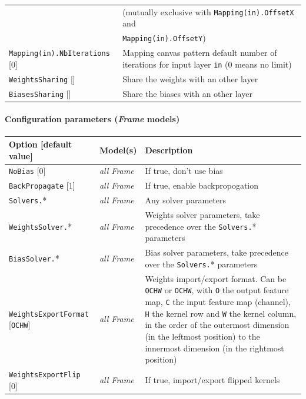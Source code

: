 \documentclass[a4paper,11pt,oneside]{article}
\begin{document}
\begin{center}
\begin{longtable}{| p{5cm} | p{10cm} | }
   & (mutually exclusive with \lstinline!Mapping(in).OffsetX! and \\
   & \lstinline!Mapping(in).OffsetY!) \\
  \lstinline!Mapping(in).NbIterations! [0] & Mapping canvas pattern default
   number of iterations for input layer \lstinline!in! (0 means no limit) \\
  \lstinline!WeightsSharing! [] & Share the weights with an other layer \\
  \lstinline!BiasesSharing! [] & Share the biases with an other layer \\
 \hline
\end{longtable}
\end{center}

\paragraph{Configuration parameters (\emph{Frame} models)}

\begin{center}
 \begin{longtable}{| p{4cm} | p{3cm} | p{9cm} | }
 \hline
 Option [default value] & Model(s) & Description\\
 \hline\hline
  \lstinline!NoBias! [0] & \emph{all Frame} & If true, don't use bias \\
  \lstinline!BackPropagate! [1] & \emph{all Frame} & If true, enable
  backpropogation \\
  \lstinline!Solvers.!* & \emph{all Frame} & Any solver parameters \\
  \lstinline!WeightsSolver.!* & \emph{all Frame} & Weights solver parameters,
  take precedence over the \lstinline!Solvers.!* parameters \\
  \lstinline!BiasSolver.!* & \emph{all Frame} & Bias solver parameters,
  take precedence over the \lstinline!Solvers.!* parameters \\
  \lstinline!WeightsExportFormat! [\lstinline!OCHW!] & \emph{all Frame} &
  Weights import/export format. Can be \lstinline!OCHW! or \lstinline!OCHW!,
  with \lstinline!O! the output feature map, \lstinline!C! the input feature map
   (channel), \lstinline!H! the kernel row and \lstinline!W! the kernel column,
   in the order of the outermost dimension (in the leftmost position) to the
   innermost dimension (in the rightmost position) \\
  \lstinline!WeightsExportFlip! [0] & \emph{all Frame} & If true,
  import/export flipped kernels \\
 \hline
\end{longtable}
\end{center}
\end{document}

